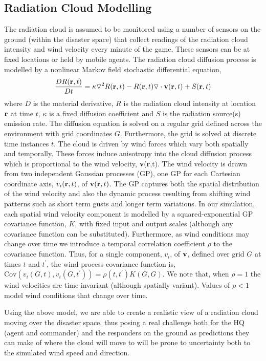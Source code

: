 \subsection{Radiation Cloud Modelling}\label{sec:radiation}
\noindent The radiation cloud is assumed to be monitored using a number of sensors on the ground (within the disaster space) that collect readings of the radiation cloud intensity and wind velocity every minute of the game. These sensors can be at fixed locations or held by mobile agents.  The radiation cloud diffusion process is modelled by a nonlinear Markov field stochastic differential equation,  
\begin{eqnarray*}
\frac{D R({\bf r}, t)}{D t}=\kappa \triangledown^2 R({\bf r},t)-R({\bf r},t)\triangledown \cdot {\bf v}({\bf r},t)+S({\bf r},t)
\end{eqnarray*}
where $D$ is the material derivative, $R$ is the radiation cloud intensity at location ${\bf r}$ at time $t$, $\kappa$ is a fixed diffusion coefficient and $S$ is the radiation source(s) emission rate. The diffusion equation is solved on a regular grid defined across the environment with grid coordinates $G$.  Furthermore, the grid is solved at discrete time instances $t$.  The cloud is driven by wind forces which vary both spatially and temporally.  These forces induce anisotropy into the cloud diffusion process which is proportional to the wind velocity, {\bf v}({\bf r},t).  The wind velocity is drawn from two independent Gaussian processes (GP), one GP for each Cartesian coordinate axis, $v_i({\bf r},t)$, of ${\bf v}({\bf r},t)$.  The GP captures both the spatial distribution of the wind velocity and also the dynamic process resulting from shifting wind patterns such as short term gusts and longer term variations.  In our simulation, each spatial wind velocity component is modelled by a squared-exponential GP covariance function, $K$, with fixed input and output scales (although any covariance function can be substituted). Furthermore, as wind conditions may change over time we introduce a temporal correlation coefficient $\rho$ to the covariance function.  Thus, for a single component, $v_i$, of ${\bf v}$, defined over grid $G$ at times $t$ and $t^\prime$, the wind process covariance function is, $\text{Cov}(v_i(G,t),v_i(G,t^\prime))=\rho(t,t^\prime) K(G,G)$.  We note that, when $\rho=1$ the wind velocities are time invariant (although spatially variant).  Values of $\rho<1$ model wind conditions that change over time.

Using the above model, we are able to create a realistic view of a radiation cloud moving over the disaster space, thus posing a real challenge both for the HQ (agent and commander) and the responders on the ground as predictions they can make of where the cloud will move to will be prone to uncertainty both to the simulated wind speed and direction. 


